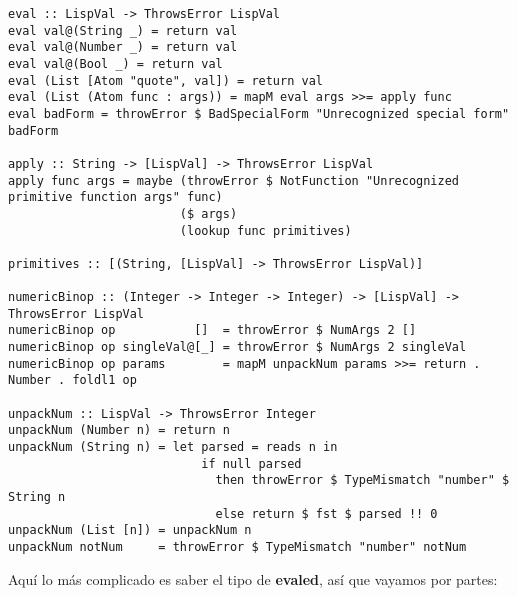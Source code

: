 \begin{minipage}{\linewidth}
\begin{small}
\begin{lstlisting}[frame=single]
eval :: LispVal -> ThrowsError LispVal
eval val@(String _) = return val
eval val@(Number _) = return val
eval val@(Bool _) = return val
eval (List [Atom "quote", val]) = return val
eval (List (Atom func : args)) = mapM eval args >>= apply func
eval badForm = throwError $ BadSpecialForm "Unrecognized special form" badForm

apply :: String -> [LispVal] -> ThrowsError LispVal
apply func args = maybe (throwError $ NotFunction "Unrecognized primitive function args" func)
                        ($ args)
                        (lookup func primitives)

primitives :: [(String, [LispVal] -> ThrowsError LispVal)]

numericBinop :: (Integer -> Integer -> Integer) -> [LispVal] -> ThrowsError LispVal
numericBinop op           []  = throwError $ NumArgs 2 []
numericBinop op singleVal@[_] = throwError $ NumArgs 2 singleVal
numericBinop op params        = mapM unpackNum params >>= return . Number . foldl1 op

unpackNum :: LispVal -> ThrowsError Integer
unpackNum (Number n) = return n
unpackNum (String n) = let parsed = reads n in 
                           if null parsed 
                             then throwError $ TypeMismatch "number" $ String n
                             else return $ fst $ parsed !! 0
unpackNum (List [n]) = unpackNum n
unpackNum notNum     = throwError $ TypeMismatch "number" notNum
\end{lstlisting}
\end{small}
\end{minipage}

Aqu\'i lo m\'as complicado es saber el tipo de \textbf{evaled}, as\'i que vayamos por partes:\\

